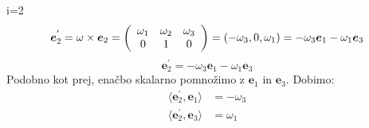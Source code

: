 \documentclass[mat1]{fmfdelo}
\newcommand{\e}{\boldsymbol e}
\begin{document}
\begin{dokaz}
i=2
\begin{equation*}
\e_2^{'} = \omega \times \e_2 = \left(
\begin{array}{c c c}
\omega_1 & \omega_2 & \omega_3 \\
0 & 1 & 0
\end{array} \right)
= (-\omega_3, 0,\omega_1) = -\omega_3\e_1 - \omega_1\e_3
\end{equation*}
\begin{equation*}
\e_2^{'} = -\omega_3\e_1-\omega_1\e_3
\end{equation*}
Podobno kot prej, enačbo skalarno pomnožimo z $\e_1$ in $\e_3$. Dobimo:
\begin{equation*}
\begin{split}
\langle \e_2^{'}, \e_1 \rangle & = -\omega_3 \\
\langle \e_2^{'}, \e_3 \rangle &= \omega_1
\end{split}
\end{equation*}


\end{dokaz}
\end{document}
